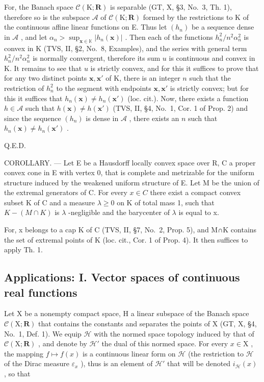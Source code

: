For, the Banach space \(\mathcal{C}(\mathrm{K};\mathbf{R})\) is separable (GT, X, §3, No.~3, Th. 1), therefore so is the subspace \(\mathcal{A}\) of \(\mathcal{C}(\mathrm{K};\mathbf{R})\) formed by the restrictions to K of the continuous affine linear functions on E. Thus let \((h_n)\) be a sequence dense in \(\mathcal{A}\) , and let \(\alpha_{n} > \sup_{\mathbf{x}\in \mathbb{K}}|h_n(\mathbf{x})|\) . Then each of the functions \(h_n^2 / n^2\alpha_n^2\) is convex in K (TVS, II, §2, No.~8, Examples), and the series with general term \(h_n^2 / n^2\alpha_n^2\) is normally convergent, therefore its sum \(u\) is continuous and convex in K. It remains to see that \(u\) is strictly convex, and for this it suffices to prove that for any two distinct points \(\mathbf{x},\mathbf{x}'\) of K, there is an integer \(n\) such that the restriction of \(h_n^2\) to the segment with endpoints \(\mathbf{x},\mathbf{x}'\) is strictly convex; but for this it suffices that \(h_n(\mathbf{x})\neq h_n(\mathbf{x}')\) (loc. cit.). Now, there exists a function \(h\in \mathcal{A}\) such that \(h(\mathbf{x})\neq h(\mathbf{x}')\) (TVS, II, §4, No.~1, Cor. 1 of Prop. 2) and since the sequence \((h_n)\) is dense in \(\mathcal{A}\) , there exists an \(n\) such that \(h_n(\mathbf{x})\neq h_n(\mathbf{x}')\) .

Q.E.D.

COROLLARY. --- Let E be a Hausdorff locally convex space over R, C a proper convex cone in E with vertex 0, that is complete and metrizable for the uniform structure induced by the weakened uniform structure of E. Let M be the union of the extremal generators of C. For every \(x \in C\) there exist a compact convex subset K of C and a measure \(\lambda \geqslant 0\) on K of total mass 1, such that \(K - (M \cap K)\) is \(\lambda\) -negligible and the barycenter of \(\lambda\) is equal to x.

For, x belongs to a cap K of C (TVS, II, §7, No.~2, Prop. 5), and M∩K contains the set of extremal points of K (loc. cit., Cor. 1 of Prop. 4). It then suffices to apply Th. 1.

\subsection{Applications: I. Vector spaces of continuous real functions}

Let X be a nonempty compact space, H a linear subspace of the Banach space \(\mathcal{C}(\mathrm{X};\mathbf{R})\) that contains the constants and separates the points of X (GT, X, §4, No.~1, Def. 1). We equip \(\mathcal{H}\) with the normed space topology induced by that of \(\mathcal{C}(\mathrm{X};\mathbf{R})\) , and denote by \(\mathcal{H}'\) the dual of this normed space. For every \(x\in \mathrm{X}\) , the mapping \(f\mapsto f(x)\) is a continuous linear form on \(\mathcal{H}\) (the restriction to \(\mathcal{H}\) of the Dirac measure \(\varepsilon_{x}\) ), thus is an element of \(\mathcal{H}'\) that will be denoted \(i_{\mathcal{H}}(x)\) , so that

